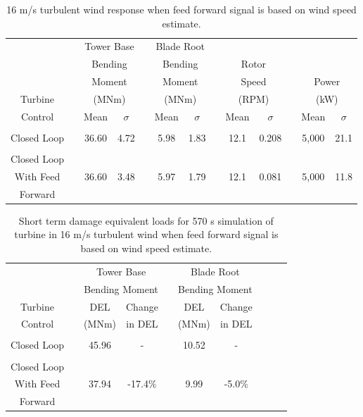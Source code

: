 \begin{table}
\centering
\begin{tabular}{ c | c c c c c c c c c c c c}
\hline
\hline
	& & \multicolumn{2}{c}{Tower Base}	& & \multicolumn{2}{c}{Blade Root}		& & \\
	& & \multicolumn{2}{c}{Bending}	& & \multicolumn{2}{c}{Bending}		& &\multicolumn{2}{c}{Rotor}	& & \\
	& & \multicolumn{2}{c}{Moment}	& & \multicolumn{2}{c}{Moment}		& &\multicolumn{2}{c}{Speed}		& &\multicolumn{2}{c}{Power} \\	
Turbine					& & \multicolumn{2}{c}{(MNm)}  					& & \multicolumn{2}{c}{(MNm)}	& & \multicolumn{2}{c}{(RPM)}	& & \multicolumn{2}{c}{(kW)}\\
\cline{3-4} \cline{6-7} \cline{9-10} \cline{12-13} 
Control & & Mean & $\sigma$ & & Mean & $\sigma$ & & Mean & $\sigma$  & & Mean & $\sigma$ \\
\hline
\\
Closed Loop  & & 36.60 & 4.72  & & 5.98 & 1.83  && 12.1 & 0.208 && 5,000  & 21.1 \\
 \\
Closed Loop\\
With Feed  & & 36.60 & 3.48  & & 5.97 & 1.79 && 12.1 & 0.081  && 5,000  & 11.8 \\
Forward\\
\hline
\hline
\end{tabular}
\caption{16 m/s turbulent wind response when feed forward signal is based on wind speed estimate.}
\label{Table3-5}
\end{table}

\begin{table}
\centering
\begin{tabular}{ c | c c c c c c c c c}
\hline
\hline
					&&\multicolumn{2}{c}{Tower Base}					&&\multicolumn{2}{c}{Blade Root} \\
					&&\multicolumn{2}{c}{Bending Moment}			&&\multicolumn{2}{c}{Bending Moment}\\
						\cline{3-4} 														\cline{6-7}
Turbine			&& DEL   	& Change										&& DEL  	& Change\\
Control			&& (MNm)  & in DEL 										&& (MNm)  & in DEL 	\\
\hline
\\
Closed Loop  && 45.96 & - 													&& 10.52 & - \\
 \\
Closed Loop\\
With Feed  		&& 37.94 & -17.4$\%$ 									&& 9.99 & -5.0$\%$\\
Forward\\
\hline
\hline
\end{tabular}
\caption{Short term damage equivalent loads for 570 s simulation of turbine in 16 m/s turbulent wind when feed forward signal is based on wind speed estimate.}
\label{Table3-6}
\end{table}

